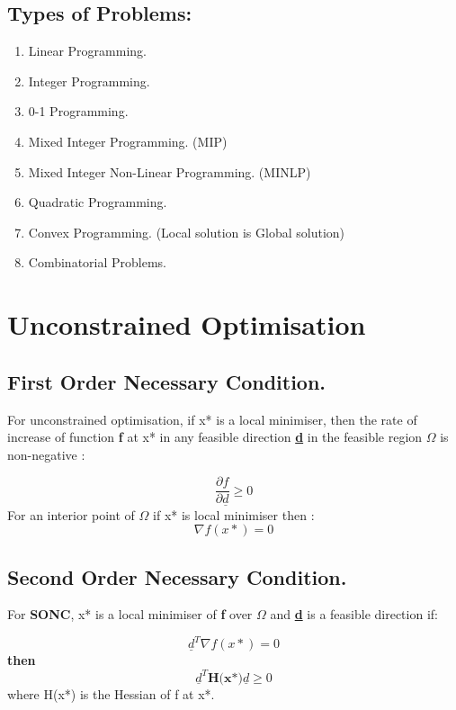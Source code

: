\documentclass[12pt,a4paper,titlepage]{article}
\begin{document}
\subsection{Types of Problems:}
\begin{enumerate}
    \item Linear Programming.
    \item Integer Programming.
    \item 0-1 Programming.
    \item Mixed Integer Programming. (MIP)
    \item Mixed Integer Non-Linear Programming. (MINLP)
    \item Quadratic Programming.
    \item Convex Programming. (Local solution is Global solution)
    \item Combinatorial Problems.
\end{enumerate}
%

\section{Unconstrained Optimisation}

\subsection{First Order Necessary Condition.}
For unconstrained optimisation, if x* is a local minimiser, then the rate of increase of function \textbf{f} at x* in any feasible direction \textbf{\underline{d}} in the feasible region $\Omega$ is non-negative :

\begin{equation}
    \dfrac{\partial f}{\partial\underline{d} } \geq 0 \label{eq1} 
\end{equation}
For an interior point of $\Omega$ if x* is local minimiser then :
\begin{equation}
    \nabla f (x*)=  0 \label{eq2} 
\end{equation}


\subsection{Second Order Necessary Condition.}
For \textbf{SONC}, x* is a local minimiser of \textbf{f} over $\Omega$ and \textbf{\underline{d}} is a feasible direction if:

\begin{equation}
    \underline{d}^T \nabla f(x*)= 0 \label{eq3}
\end{equation}
\textbf{then}
\begin{equation}
    \underline{d}^T \textbf{H(x*)} \underline{d} \geq 0 \label{eq4}
\end{equation}
where H(x*) is the Hessian of f at x*.
\end{document}
